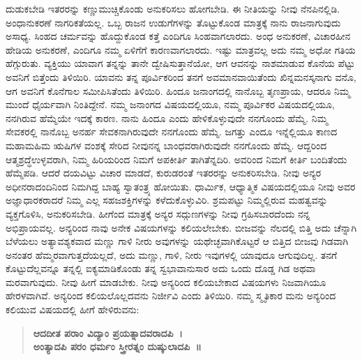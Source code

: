 ದುಡುಕಬೇಡಿ ಇತರರನ್ನು ಕಣ್ಣುಮುಚ್ಚಿಕೊಂಡು ಅನುಕರಿಸಲು ಹೋಗಬೇಡಿ. ಈ ನೀತಿಯನ್ನು ನೀವು ನೆನಪಿನಲ್ಲಿಡಿ. ಅಂಧಾನುಕರಣೆ ನಾಗರಿಕತೆಯಲ್ಲ. ಒಬ್ಬ ರಾಜನ ಉಡುಗೆಗಳನ್ನು ತೊಟ್ಟುಕೊಂಡ ಮಾತ್ರಕ್ಕೆ ನಾನು ರಾಜನಾಗುವುದು ಅಸಾಧ್ಯ. ಸಿಂಹದ ಚರ್ಮವನ್ನು ಹೊದ್ದುಕೊಂಡ ಕತ್ತೆ ಎಂದಿಗೂ ಸಿಂಹವಾಗಲಾರದು. ಅಂಧ ಅನುಕರಣೆ, ವಿಚಾರಹೀನ ಹೇಡಿಯ ಅನುಕರಣೆ, ಎಂದಿಗೂ ನಮ್ಮ ಏಳಿಗೆಗೆ ಕಾರಣವಾಗಲಾರದು. ಇಷ್ಟು ಮಾತ್ರವಲ್ಲ ಅದು ನಮ್ಮ ಅಧೋ ಗತಿಯ ಹೆಗ್ಗುರುತು. ವ್ಯಕ್ತಿಯು ಯಾವಾಗ ತನ್ನನ್ನು ತಾನೇ ದ್ವೇಷಿಸುತ್ತಾನೆಯೋ, ಆಗ ಆವನನ್ನು ನಾಶಮಾಡುವ ಕೊನೆಯ ಪೆಟ್ಟು ಅವನಿಗೆ ಬಿತ್ತೆಂದು ತಿಳಿಯಿರಿ. ಯಾವನು ತನ್ನ ಪೂರ್ವಿಕರಿಂದ ತನಗೆ ಅವಮಾನವಾಯಿತೆಂದು ಖಿನ್ನಮನಸ್ಕನಾಗು ವನೊ, ಆಗ ಅವನಿಗೆ ಕೊನೆಗಾಲ ಸಮೀಪಿಸಿತೆಂದು ತಿಳಿಯಿರಿ. ಹಿಂದೂ ಜನಾಂಗದಲ್ಲಿ ನಾನೊಬ್ಬ ತೃಣಪ್ರಾಯ, ಆದರೂ ನಿಮ್ಮ ಮುಂದೆ ಧೈರ್ಯವಾಗಿ ನಿಂತಿದ್ದೇನೆ. ನಮ್ಮ ಜನಾಂಗದ ವಿಷಯದಲ್ಲಿಯೂ, ನಮ್ಮ ಪೂರ್ವಿಕರ ವಿಷಯದಲ್ಲಿಯೂ, ನನಗಿರುವ ಹೆಮ್ಮೆಯೇ ಇದಕ್ಕೆ ಕಾರಣ. ನಾನು ಹಿಂದೂ ಎಂದು ಹೇಳಿಕೊಳ್ಳುವುದೇ ನನಗೊಂದು ಹೆಮ್ಮೆ. ನಿಮ್ಮ ಸೇವಕರಲ್ಲಿ ನಾನೊಬ್ಬ ಅನರ್ಹ ಸೇವಕನಾಗಿರುವುದೇ ನನಗೊಂದು ಹೆಮ್ಮೆ. ಜಗತ್ತು ಎಂದೂ ಇನ್ನೆಲ್ಲಿಯೂ ಕಾಣದ ಮಹಾಮಹಿಮ ಋಷಿಗಳ ವಂಶಕ್ಕೆ ಸೇರಿದ ನೀವು\break ನನ್ನ ಬಾಂಧವರಾಗಿರುವುದೇ ನನಗೊಂದು ಹೆಮ್ಮೆ. ಆದ್ದರಿಂದ ಆತ್ಮಶ್ರದ್ಧೆ\break ಉಳ್ಳವರಾಗಿ, ನಿಮ್ಮ ಹಿರಿಯರಿಂದ ನಿಮಗೆ ಅಪಕೀರ್ತಿ ತಾಗಿತೆನ್ನದಿರಿ. ಅವರಿಂದ ನಿಮಗೆ ಕೀರ್ತಿ ಬಂದಿತೆಂದು ಹೆಮ್ಮೆಪಡಿ. ಆದರೆ ದಯವಿಟ್ಟು ವಿಚಾರ ಮಾಡದೆ, ಕುರುಡರಂತೆ ಇತರರನ್ನು ಅನುಕರಿಸಬೇಡಿ. ನೀವು ಅನ್ಯರ ಅಧೀನರಾದಂದಿನಿಂದ ನಿಮಗಿದ್ದ ಬಾಹ್ಯ ಸ್ವಾತಂತ್ರ್ಯ ಹೋಯಿತು. ಧಾರ್ಮಿಕ, ಆಧ್ಯಾತ್ಮಿಕ ವಿಷಯದಲ್ಲಿಯೂ ನೀವು ಅವರ ಅಜ್ಞಾಧಾರಕರಾದರೆ ನಿಮ್ಮ ಎಲ್ಲ ಸಹಜಶಕ್ತಿಗಳನ್ನು ಕಳೆದುಕೊಳ್ಳುವಿರಿ. ಶ್ರಮಪಟ್ಟು ನಿಮ್ಮಲ್ಲಿರುವ ಮಹತ್ವವನ್ನು ವ್ಯಕ್ತಗೊಳಿಸಿ, ಅನುಕರಿಸಬೇಡಿ. ಹೀಗೆಂದ ಮಾತ್ರಕ್ಕೆ ಅನ್ಯರ ಸದ್ಗುಣಗಳನ್ನು ನೀವು ಗ್ರಹಿಸಬಾರದೆಂದು ನನ್ನ ಅಭಿಪ್ರಾಯವಲ್ಲ. ಅನ್ಯರಿಂದ ನಾವು ಅನೇಕ ವಿಷಯಗಳನ್ನು ಕಲಿಯಲೇಬೇಕು. ಬೀಜವನ್ನು ನೆಲದಲ್ಲಿ ಬಿತ್ತಿ ಅದು ಚೆನ್ನಾಗಿ ಬೆಳೆಯಲು ಅತ್ಯಾವಶ್ಯಕವಾದ ಮಣ್ಣು ಗಾಳಿ ನೀರು ಅವುಗಳನ್ನು ಯಥೇಚ್ಛವಾಗಿಕೊಟ್ಟರೆ ಆ ಬಿತ್ತಿದ ಬೀಜವು ಗಿಡವಾಗಿ ಅನಂತರ ಹೆಮ್ಮರವಾಗುತ್ತದೆಯಲ್ಲದೆ, ಅದು ಮಣ್ಣು, ಗಾಳಿ, ನೀರು ಇವುಗಳಲ್ಲಿ ಯಾವುದೂ ಆಗುವುದಿಲ್ಲ. ತನಗೆ ಕೊಟ್ಟುದೆಲ್ಲವನ್ನೂ ತನ್ನಲ್ಲಿ ಐಕ್ಯಮಾಡಿಕೊಂಡು ತನ್ನ ಸ್ವಭಾವಾನುಸಾರ ಅದು ಒಂದು ದೊಡ್ಡ ಗಿಡ ಅಥವಾ ಮರವಾಗುವುದು. ನೀವು ಹೀಗೆ ಮಾಡಬೇಕು. ನೀವು ಅನ್ಯರಿಂದ ಕಲಿಯಬೇಕಾದ ವಿಷಯಗಳು ನಿಜವಾಗಿಯೂ ಹೇರಳವಾಗಿವೆ. ಅನ್ಯರಿಂದ ಕಲಿಯಲೊಲ್ಲದವನು ನಿರ್ಜೀವಿ ಎಂದು ತಿಳಿಯಿರಿ. ನಮ್ಮ ಸ್ಮೃತಿಕಾರ ಮನು ಅನ್ಯರಿಂದ ಕಲಿಯುವ ವಿಷಯದಲ್ಲಿ ಹೀಗೆ ಹೇಳಿರುವನು:

\begin{verse}
\textbf{ಆದದೀತ ಪರಾಂ ವಿದ್ಯಾಂ ಪ್ರಯತ್ನಾದವರಾದಪಿ~।}\\\textbf{ಅಂತ್ಯಾದಪಿ ಪರಂ ಧರ್ಮಂ ಸ್ತ್ರೀರತ್ನಂ ದುಷ್ಕುಲಾದಪಿ~॥}
\end{verse}

